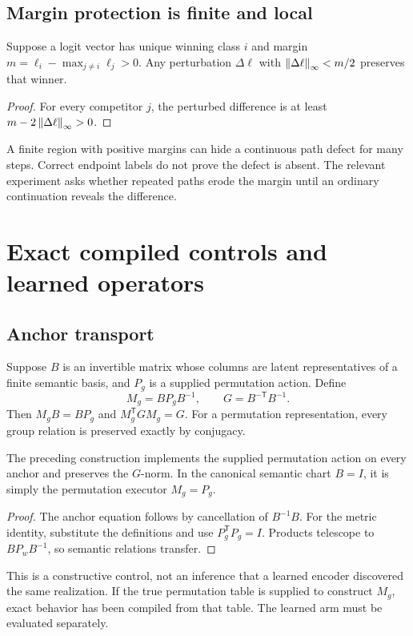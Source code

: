 \documentclass[11pt]{article}
\begin{document}
\subsection{Margin protection is finite and local}
\begin{proposition}
Suppose a logit vector has unique winning class \(i\) and margin \(m=\ell_i-\max_{j\ne i}\ell_j>0\). Any perturbation \(\Delta\ell\) with \(\left\lVert\Delta\ell\right\rVert_\infty<m/2\) preserves that winner.
\end{proposition}
\begin{proof}
For every competitor \(j\), the perturbed difference is at least \(m-2\left\lVert\Delta\ell\right\rVert_\infty>0\).
\end{proof}
A finite region with positive margins can hide a continuous path defect for many steps. Correct endpoint labels do not prove the defect is absent. The relevant experiment asks whether repeated paths erode the margin until an ordinary continuation reveals the difference.

\section{Exact compiled controls and learned operators}
\subsection{Anchor transport}
Suppose \(B\) is an invertible matrix whose columns are latent representatives of a finite semantic basis, and \(P_g\) is a supplied permutation action. Define
\[
 M_g=BP_gB^{-1},\qquad G=B^{-\mathsf T}B^{-1}.
\]
Then \(M_gB=BP_g\) and \(M_g^{\mathsf T}GM_g=G\). For a permutation representation, every group relation is preserved exactly by conjugacy.

\begin{proposition}
The preceding construction implements the supplied permutation action on every anchor and preserves the \(G\)-norm. In the canonical semantic chart \(B=I\), it is simply the permutation executor \(M_g=P_g\).
\end{proposition}
\begin{proof}
The anchor equation follows by cancellation of \(B^{-1}B\). For the metric identity, substitute the definitions and use \(P_g^{\mathsf T}P_g=I\). Products telescope to \(BP_wB^{-1}\), so semantic relations transfer.
\end{proof}
This is a constructive control, not an inference that a learned encoder discovered the same realization. If the true permutation table is supplied to construct \(M_g\), exact behavior has been compiled from that table. The learned arm must be evaluated separately.
\end{document}
